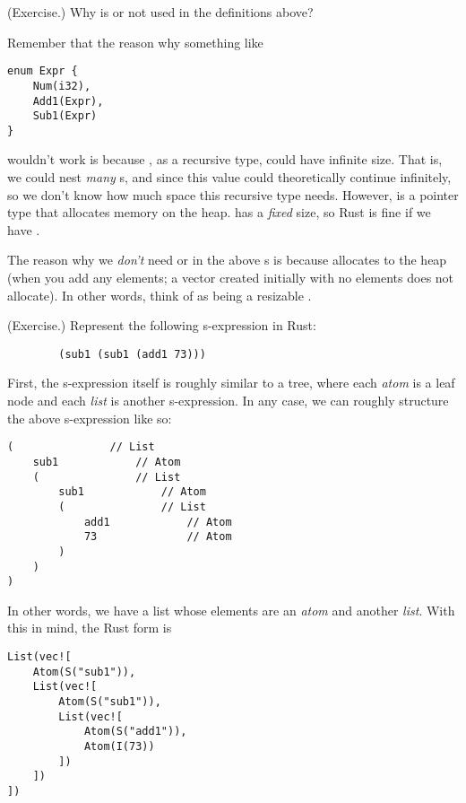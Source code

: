 \documentclass[letterpaper]{article}
\begin{document}
\begin{mdframed}
    (Exercise.) Why is  or  not used in the  definitions above? 

    \begin{mdframed}
        Remember that the reason why something like 
        \begin{verbatim}
enum Expr {
    Num(i32),
    Add1(Expr),
    Sub1(Expr)
}\end{verbatim}
        wouldn't work is because , as a recursive type, could have infinite size. That is, we could nest \emph{many} s, and since this value could theoretically continue infinitely, so we don't know how much space this recursive type needs. However,  is a pointer type that allocates memory on the heap.  has a \emph{fixed} size, so Rust is fine if we have . 

        \bigskip

        The reason why we \emph{don't} need  or  in the above s is because  allocates to the heap (when you add any elements; a vector created initially with no elements does not allocate). In other words, think of  as being a resizable . 
    \end{mdframed}
\end{mdframed}


\begin{mdframed}
    (Exercise.) Represent the following s-expression in Rust: 
    \begin{verbatim}
        (sub1 (sub1 (add1 73)))\end{verbatim}
    
    \begin{mdframed}
        First, the s-expression itself is roughly similar to a tree, where each \emph{atom} is a leaf node and each \emph{list} is another s-expression. In any case, we can roughly structure the above s-expression like so: 
        \begin{verbatim}
(               // List
    sub1            // Atom 
    (               // List 
        sub1            // Atom 
        (               // List 
            add1            // Atom 
            73              // Atom 
        )
    )
) \end{verbatim}
        In other words, we have a list whose elements are an \emph{atom} and another \emph{list}. With this in mind, the Rust form is
        \begin{verbatim}
List(vec![
    Atom(S("sub1")),
    List(vec![
        Atom(S("sub1")),
        List(vec![
            Atom(S("add1")),
            Atom(I(73))
        ])
    ])
])\end{verbatim}
    \end{mdframed}
\end{mdframed}
\end{document}
